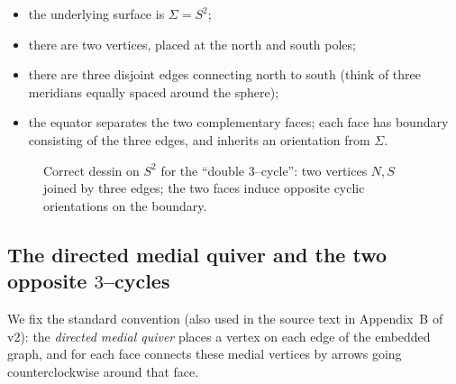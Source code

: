 \documentclass[11pt,oneside]{amsbook}
\numberwithin{equation}{section}
\theoremstyle{plain}
\theoremstyle{definition}
\theoremstyle{remark}
\begin{document}
\begin{itemize}
\item the underlying surface is $\Sigma=S^2$;
\item there are two vertices, placed at the north and south poles;
\item there are three disjoint edges connecting north to south (think of three meridians equally spaced around the sphere);
\item the equator separates the two complementary faces; each face has boundary consisting of the three edges, and inherits an orientation from $\Sigma$.
\end{itemize}

\begin{figure}[h]
\centering
{}
\caption{Correct dessin on $S^2$ for the ``double $3$--cycle'': two vertices $N,S$ joined by three edges; the two faces induce opposite cyclic orientations on the boundary.}
\label{fig:sphere_dessin}
\end{figure}

\subsection{The directed medial quiver and the two opposite $3$--cycles}

We fix the standard convention (also used in the source text in Appendix~B of v2): the \emph{directed medial quiver} places a vertex on each edge of the embedded graph, and for each face connects these medial vertices by arrows going counterclockwise around that face.
\end{document}

